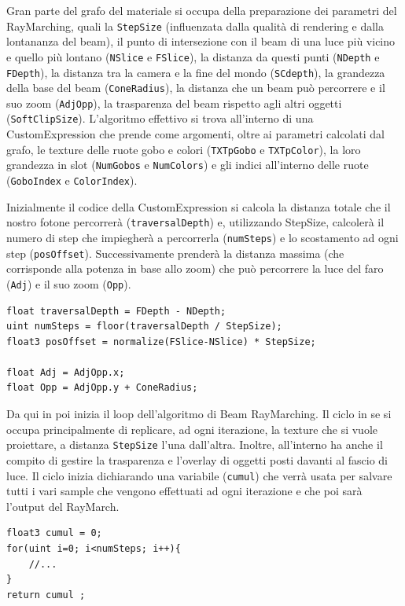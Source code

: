 \documentclass[main.tex]{subfiles}
\begin{document}
\noindent Gran parte del grafo del materiale si occupa della preparazione dei parametri del RayMarching, quali la \lstinline{StepSize} (influenzata dalla qualità di rendering e dalla lontananza del beam), il punto di intersezione con il beam di una luce più vicino e quello più lontano (\lstinline{NSlice} e \lstinline{FSlice}), la distanza da questi punti (\lstinline{NDepth} e \lstinline{FDepth}), la distanza tra la camera e la fine del mondo (\lstinline{SCdepth}), la grandezza della base del beam (\lstinline{ConeRadius}), la distanza che un beam può percorrere e il suo zoom (\lstinline{AdjOpp}), la trasparenza del beam rispetto agli altri oggetti (\lstinline{SoftClipSize}). L'algoritmo effettivo si trova all'interno di una CustomExpression che prende come argomenti, oltre ai parametri calcolati dal grafo, le texture delle ruote gobo e colori (\lstinline{TXTpGobo} e \lstinline{TXTpColor}), la loro grandezza in slot (\lstinline{NumGobos} e \lstinline{NumColors}) e gli indici all'interno delle ruote (\lstinline{GoboIndex} e \lstinline{ColorIndex}). \newline

Inizialmente il codice della CustomExpression si calcola la distanza totale che il nostro fotone percorrerà (\lstinline{traversalDepth}) e, utilizzando StepSize, calcolerà il numero di step che impiegherà a percorrerla (\lstinline{numSteps}) e lo scostamento ad ogni step (\lstinline{posOffset}). Successivamente prenderà la distanza massima (che corrisponde alla potenza in base allo zoom) che può percorrere la luce del faro (\lstinline{Adj}) e il suo zoom (\lstinline{Opp}).
\lstset{language=glsl}
\begin{lstlisting}
float traversalDepth = FDepth - NDepth;
uint numSteps = floor(traversalDepth / StepSize);
float3 posOffset = normalize(FSlice-NSlice) * StepSize;

float Adj = AdjOpp.x;
float Opp = AdjOpp.y + ConeRadius;
\end{lstlisting}

Da qui in poi inizia il loop dell'algoritmo di Beam RayMarching. Il ciclo in se si occupa principalmente di replicare, ad ogni iterazione, la texture che si vuole proiettare, a distanza \lstinline{StepSize} l'una dall'altra. Inoltre, all'interno ha anche il compito di gestire la trasparenza e l'overlay di oggetti posti davanti al fascio di luce. Il ciclo inizia dichiarando una variabile (\lstinline{cumul}) che verrà usata per salvare tutti i vari sample che vengono effettuati ad ogni iterazione e che poi sarà l'output del RayMarch.
\begin{lstlisting}
float3 cumul = 0;
for(uint i=0; i<numSteps; i++){
    //...
}
return cumul ;
\end{lstlisting}
\end{document}
